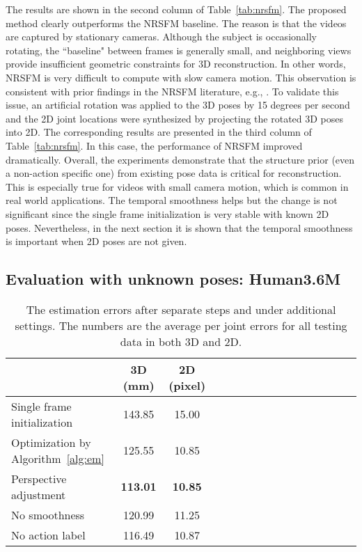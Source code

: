 \documentclass[10pt,twocolumn,letterpaper]{article}
\newcommand{\refAlg}[1]{Algorithm~\ref{#1}}
\newcommand{\refTab}[1]{Table~\ref{#1}}
\begin{document}
{The results are shown in the second column of \refTab{tab:nrsfm}. The proposed method clearly outperforms the NRSFM baseline. The reason is that the videos are captured by stationary cameras. Although the subject is occasionally rotating, the ``baseline" between frames is generally small, and neighboring views provide insufficient geometric constraints for 3D reconstruction. In other words, NRSFM is very difficult to compute with slow camera motion. This observation is consistent with prior findings in the NRSFM literature, e.g., \cite{akhter2011trajectory}. To validate this issue, an artificial rotation was applied to the 3D poses by 15 degrees per second and the 2D joint locations were synthesized by projecting the rotated 3D poses into 2D. The corresponding results are presented in the third column of \refTab{tab:nrsfm}. In this case, the performance of NRSFM improved dramatically. Overall, the experiments demonstrate that the structure prior (even a non-action specific one) from existing pose data is critical for reconstruction.
This is especially true for videos with small camera motion, which is common in real world applications. The temporal smoothness helps but the change is not significant since the single frame initialization is very stable with known 2D poses. Nevertheless,
in the next section it is shown that the temporal smoothness is important when 2D poses are not given.

\subsection{Evaluation with unknown poses: Human3.6M }\label{sec:h36m}


\begin{table}
\centering
\renewcommand{\arraystretch}{1.2}
\begin{tabular}{l*{15}{c}}
\toprule
 & 3D (mm) & 2D (pixel) \\
\toprule
Single frame initialization & 143.85 & 15.00 \\
Optimization by \refAlg{alg:em} & 125.55 & 10.85 \\
Perspective adjustment & \textbf{113.01} & \textbf{10.85} \\
\hline
No smoothness & 120.99 & 11.25 \\
No action label & 116.49 & 10.87 \\
\toprule
\end{tabular}
\vspace{0.25em}
\caption{The estimation errors after separate steps and under additional settings. The numbers are the average per joint errors for all testing data in both 3D and 2D.}\label{tab:steps}
\vspace{-1em}
\end{table}

}
\end{document}
